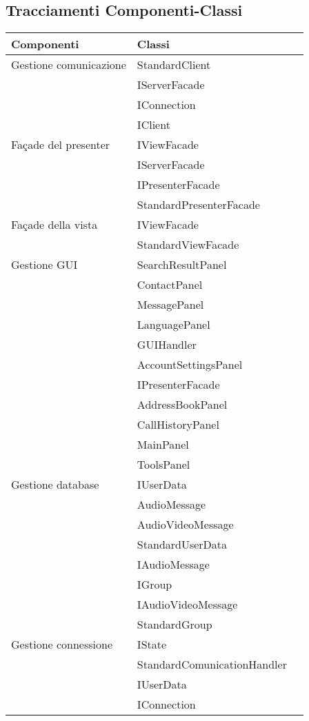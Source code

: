 \subsection{Tracciamenti Componenti-Classi}\label{sec:tracCompClass}

\begin{center}
\begin{longtable}{lp{}l}
\toprule Componenti & Classi\\
\midrule
Gestione comunicazione & StandardClient \\
 & IServerFacade \\
 & IConnection \\
 & IClient \\
Façade del presenter & IViewFacade \\
 & IServerFacade \\
 & IPresenterFacade \\
 & StandardPresenterFacade \\
Façade della vista & IViewFacade \\
 & StandardViewFacade \\
Gestione GUI & SearchResultPanel \\
 & ContactPanel \\
 & MessagePanel \\
 & LanguagePanel \\
 & GUIHandler \\
 & AccountSettingsPanel \\
 & IPresenterFacade \\
 & AddressBookPanel \\
 & CallHistoryPanel \\
 & MainPanel \\
 & ToolsPanel \\
Gestione database & IUserData \\
 & AudioMessage \\
 & AudioVideoMessage \\
 & StandardUserData \\
 & IAudioMessage \\
 & IGroup \\
 & IAudioVideoMessage \\
 & StandardGroup \\
Gestione connessione & IState \\
 & StandardComunicationHandler \\
 & IUserData \\
 & IConnection \\

\end{longtable}
\end{center}
